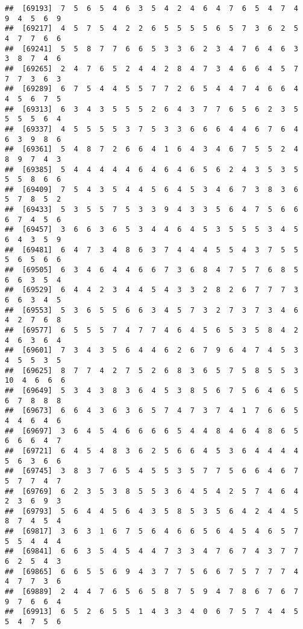 \documentclass[
]{book}
\begin{document}
\begin{verbatim}
##  [69193]  7  5  6  5  4  6  3  5  4  2  4  6  4  7  6  5  4  7  4  9  4  5  6  9
##  [69217]  4  5  7  5  4  2  2  6  5  5  5  5  6  5  7  3  6  2  5  4  7  7  6  6
##  [69241]  5  5  8  7  7  6  6  5  3  3  6  2  3  4  7  6  4  6  3  3  8  7  4  6
##  [69265]  2  4  7  6  5  2  4  4  2  8  4  7  3  4  6  6  4  5  7  7  7  3  6  3
##  [69289]  6  7  5  4  4  5  5  7  7  2  6  5  4  4  7  4  6  6  4  4  5  6  7  5
##  [69313]  6  3  4  3  5  5  5  2  6  4  3  7  7  6  5  6  2  3  5  5  5  5  6  4
##  [69337]  4  5  5  5  5  3  7  5  3  3  6  6  6  4  4  6  7  6  4  6  3  9  8  6
##  [69361]  5  4  8  7  2  6  6  4  1  6  4  3  4  6  7  5  5  2  4  8  9  7  4  3
##  [69385]  5  4  4  4  4  4  6  4  6  4  6  5  6  2  4  3  5  3  5  5  5  8  6  6
##  [69409]  7  5  4  3  5  4  4  5  6  4  5  3  4  6  7  3  8  3  6  5  7  8  5  2
##  [69433]  5  3  5  5  7  5  3  3  9  4  3  3  5  6  4  7  5  6  6  6  7  4  5  6
##  [69457]  3  6  6  3  6  5  3  4  4  6  4  5  3  5  5  5  3  4  5  6  4  3  5  9
##  [69481]  6  4  7  3  4  8  6  3  7  4  4  4  5  5  4  3  7  5  5  5  6  5  6  6
##  [69505]  6  3  4  6  4  4  6  6  7  3  6  8  4  7  5  7  6  8  5  6  6  3  5  4
##  [69529]  6  4  4  2  3  4  4  5  4  3  3  2  8  2  6  7  7  7  3  6  6  3  4  5
##  [69553]  5  3  6  5  5  6  6  3  4  5  7  3  2  7  3  7  3  4  6  4  2  7  6  8
##  [69577]  6  5  5  5  7  4  7  7  4  6  4  5  6  5  3  5  8  4  2  4  6  3  6  4
##  [69601]  7  3  4  3  5  6  4  4  6  2  6  7  9  6  4  7  4  5  3  4  5  5  3  5
##  [69625]  8  7  7  4  2  7  5  2  6  8  3  6  5  7  5  8  5  5  3 10  4  6  6  6
##  [69649]  5  3  4  3  8  3  6  4  5  3  8  5  6  7  5  6  4  6  5  6  7  8  8  8
##  [69673]  6  6  4  3  6  3  6  5  7  4  7  3  7  4  1  7  6  6  5  4  4  6  4  6
##  [69697]  3  6  4  5  4  6  6  6  6  5  4  4  8  4  6  4  8  6  5  6  6  6  4  7
##  [69721]  6  4  5  4  8  3  6  2  5  6  6  4  5  3  6  4  4  4  4  5  6  3  6  6
##  [69745]  3  8  3  7  6  5  4  5  5  3  5  7  7  5  6  6  4  6  7  5  7  7  4  7
##  [69769]  6  2  3  5  3  8  5  5  3  6  4  5  4  2  5  7  4  6  4  2  3  6  9  3
##  [69793]  5  6  4  4  5  6  4  3  5  8  5  3  5  6  4  2  4  4  5  8  7  4  5  4
##  [69817]  3  6  3  1  6  7  5  6  4  6  6  5  6  4  5  4  6  5  7  5  5  4  4  4
##  [69841]  6  6  3  5  4  5  4  4  7  3  3  4  7  6  7  4  3  7  7  6  2  5  4  3
##  [69865]  6  6  5  5  6  9  4  3  7  7  5  6  6  7  5  7  7  7  4  4  7  7  3  6
##  [69889]  2  4  4  7  6  5  6  5  8  7  5  9  4  7  8  6  7  6  7  9  7  6  6  4
##  [69913]  6  5  2  6  5  5  1  4  3  3  4  0  6  7  5  7  4  4  5  5  4  7  5  6

\end{verbatim}
\end{document}
